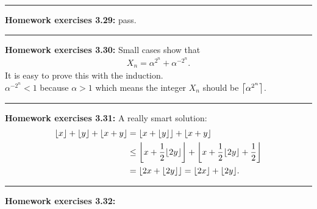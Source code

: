 \documentclass{article}
\DeclarePairedDelimiter\ceil{\lceil}{\rceil}
\DeclarePairedDelimiter\floor{\lfloor}{\rfloor}
\begin{document}
\noindent\rule{\textwidth}{0.4pt}
\textbf{Homework exercises 3.29:}
pass.

\noindent\rule{\textwidth}{0.4pt}
\textbf{Homework exercises 3.30:}
Small cases show that 
\begin{align}
X_n = \alpha^{2^n} + \alpha^{-2^n}.
\end{align}
It is easy to prove this with the induction.\\
$\alpha^{-2^n} < 1$ because $\alpha > 1$ which means the integer $X_n$ should be $\ceil*{\alpha^{2^n}}$.

\noindent\rule{\textwidth}{0.4pt}
\textbf{Homework exercises 3.31:}
A really smart solution:
\begin{align}
\floor{x} + \floor{y} + \floor{x + y} &= \floor{x + \floor{y}} + \floor{x + y} \\
				      &\le \floor*{x + \frac{1}{2}\floor{2y}} + \floor*{x + \frac{1}{2}\floor{2y} + \frac{1}{2}} \\
				      &= \floor*{2x + \floor{2y}} = \floor{2x} + \floor{2y}.
\end{align}

\noindent\rule{\textwidth}{0.4pt}
\textbf{Homework exercises 3.32:}
\end{document}
